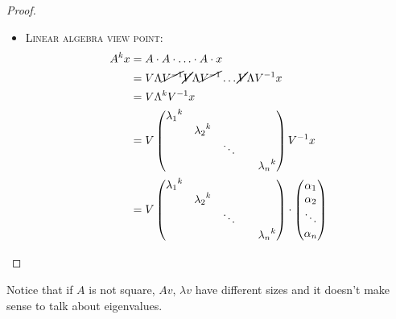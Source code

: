 \documentclass[computationalMathematics.tex]{subfiles}
\begin{document}
\begin{proof}
\begin{itemize}
  \item \textsc{Linear algebra view point:}
    \begin{equation}
      \begin{split}
        A^k x &= A \cdot A \cdot \ldots \cdot A \cdot x\\
        &=V \Lambda \cancel{{V}^{-1}} \cancel{V} \Lambda \cancel{{V}^{-1}} \ldots \cancel{V} \Lambda {V}^{-1} x\\
        &= V \Lambda^k {V}^{-1} x\\
        &=V \begin{pmatrix}
          {\lambda_1}^k\\
          & {\lambda_2}^k\\
          && \ddots\\
          &&&& {\lambda_n}^k\\
        \end{pmatrix}
        {V}^{-1} x\\
        &=V \begin{pmatrix}
          {\lambda_1}^k\\
          & {\lambda_2}^k\\
          && \ddots\\
          &&&& {\lambda_n}^k\\
        \end{pmatrix}
        \cdot \begin{pmatrix}
          {\alpha_1}\\
          {\alpha_2}\\
          \ddots\\
          {\alpha_n}\\
        \end{pmatrix}
      \end{split}
    \end{equation}

  \end{itemize}
\end{proof}

Notice that if $A$ is not square, $Av$, $\lambda v$ have different sizes and it doesn't make sense to talk about eigenvalues.
\end{document}
